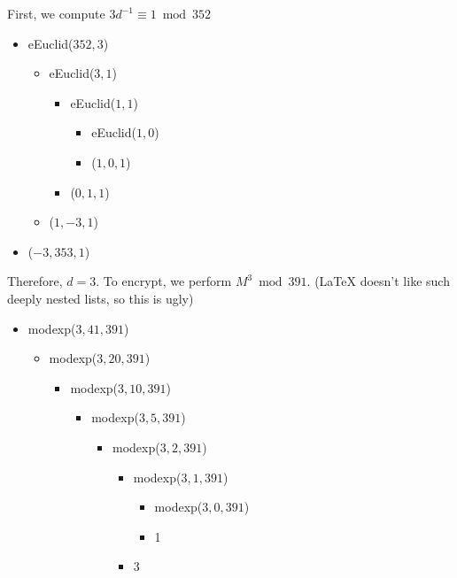 \documentclass{article}
\begin{document}
\begin{enumerate}
    First, we compute $3d^{-1} \equiv 1 \bmod 352$
    \begin{itemize}
        \item eEuclid($352, 3$)
        \begin{itemize}
            \item eEuclid($3, 1$)
            \begin{itemize}
                \item eEuclid($1, 1$)
                \begin{itemize}
                    \item eEuclid($1, 0$)
                    \item ($1, 0, 1$)
                \end{itemize}
                \item ($0, 1, 1$)
            \end{itemize}
            \item ($1, -3, 1$)
        \end{itemize}
        \item ($-3, 353, 1$)
    \end{itemize}
    Therefore, $d = 3$.
    To encrypt, we perform $M^3 \bmod 391$.
    (LaTeX doesn't like such deeply nested lists, so this is ugly)
    \begin{itemize}
        \item modexp($3, 41, 391$)
        \begin{itemize}
            \item modexp($3, 20, 391$)
            \begin{itemize}
                \item modexp($3, 10, 391$)
                \begin{itemize}
                    \item modexp($3, 5, 391$)
                    \begin{itemize}
                        \item modexp($3, 2, 391$)
                        \begin{itemize}
                            \item modexp($3, 1, 391$)
                            \begin{itemize}
                                \item modexp($3, 0, 391$)
                                \item 1
                            \end{itemize}
                            \item 3

\end{itemize}
\end{itemize}
\end{itemize}
\end{itemize}
\end{itemize}
\end{itemize}
\end{enumerate}
\end{document}
